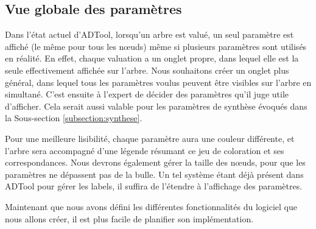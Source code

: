 	\subsection{Vue globale des paramètres}
		Dans l'état actuel d'ADTool, lorsqu'un arbre est valué, un seul paramètre est affiché (le même pour tous les nœuds) même si plusieurs paramètres sont utilisés en réalité. En effet, chaque valuation a un onglet propre, dans lequel elle est la seule effectivement affichée sur l'arbre. Nous souhaitons créer un onglet plus général, dans lequel tous les paramètres voulus peuvent être visibles sur l'arbre en simultané. C'est ensuite à l'expert de décider des paramètres qu'il juge utile d'afficher. Cela serait aussi valable pour les paramètres de synthèse évoqués dans la {\sc Sous-section} \ref{subsection:synthese}.
	
		Pour une meilleure lisibilité, chaque paramètre aura une couleur différente, et l'arbre sera accompagné d'une légende résumant ce jeu de coloration et ses correspondances. Nous devrons également gérer la taille des nœuds, pour que les paramètres ne dépassent pas de la bulle. Un tel système étant déjà présent dans ADTool pour gérer les labels, il suffira de l'étendre à l'affichage des paramètres.

		Maintenant que nous avons défini les différentes fonctionnalités du logiciel que nous allons créer, il est plus facile de planifier son implémentation.
